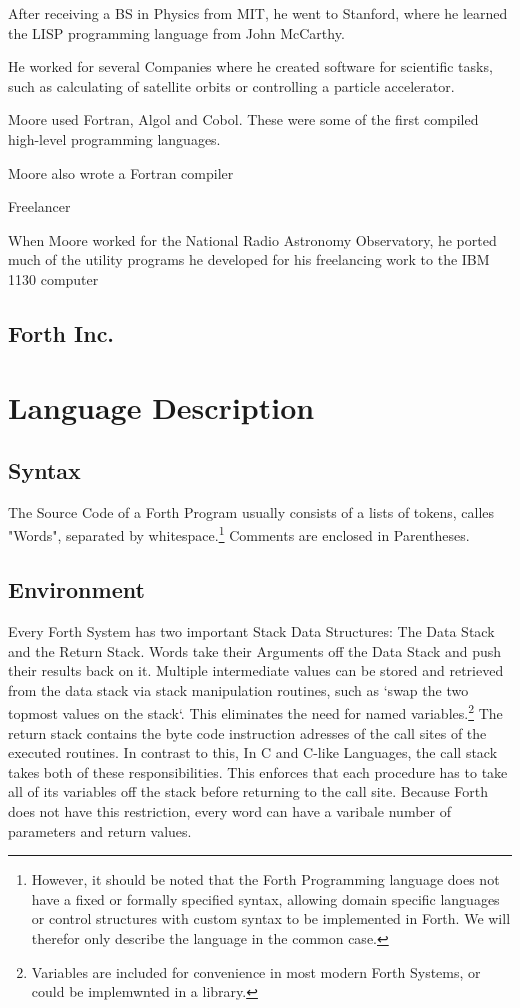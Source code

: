 \documentclass{llncs}
\begin{document}
After receiving a BS in Physics from MIT, he went to Stanford, where he learned the LISP programming language from John McCarthy. \cite{chuckbio}

He worked for several Companies where he created software for scientific tasks, such as calculating of satellite orbits or controlling a particle accelerator.

Moore used Fortran, Algol and Cobol. These were some of the first compiled high-level programming languages.

Moore also wrote a Fortran compiler

Freelancer

When Moore worked for the National Radio Astronomy Observatory, he ported much of the utility programs he developed for his freelancing work to the IBM 1130 computer

 
\subsection{Forth Inc.}

 \section{Language Description}



 \subsection{Syntax}
The Source Code of a Forth Program usually consists of a lists of tokens, calles "Words", separated by whitespace.\footnote{However, it should be noted that the Forth Programming language does not have a fixed or formally specified syntax, allowing domain specific languages or control structures with custom syntax to be implemented in Forth. We will therefor only describe the language in the common case.} Comments are enclosed in Parentheses.

 \subsection{Environment}

Every Forth System has two important Stack Data Structures: The Data Stack and the Return Stack. Words take their Arguments off the Data Stack and push their results back on it. Multiple intermediate values can be stored and retrieved from the data stack via stack manipulation routines, such as `swap the two topmost values on the stack`. This eliminates the need for named variables.\footnote{Variables are included for convenience in most modern Forth Systems, or could be implemwnted in a library.}
The return stack contains the byte code instruction adresses of the call sites of the executed routines.
In contrast to this, In C and C-like Languages, the call stack takes both of these responsibilities. This enforces that each procedure has to take all of its variables off the stack before returning to the call site.
Because Forth does not have this restriction, every word can have a varibale number of parameters and return values.
\end{document}
